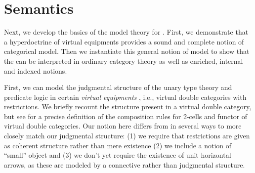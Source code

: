 \documentclass{llncs}
\begin{document}
\section{Semantics}
\label{sec:semantics}

Next, we develop the basics of the model theory for \ohol{}.
%
First, we demonstrate that a hyperdoctrine of virtual equipments
provides a sound and complete notion of categorical model.
%
Then we instantiate this general notion of model to show that the
\ohol{} can be interpreted in ordinary category theory as well as
enriched, internal and indexed notions.


First, we can model the judgmental structure of the unary type theory
and predicate logic in certain \emph{virtual equipments}
\cite{LEINSTER2002391,Cruttwell2010}, i.e., virtual double categories with
restrictions. We briefly recount the structure present in a virtual
double category, but see \citet{Cruttwell2010} for a precise
definition of the composition rules for 2-cells and functor of virtual
double categories.
%
Our notion here differs from \citet{Cruttwell2010} in several ways
to more closely match our judgmental structure: (1) we require that
restrictions are given as coherent structure rather than mere
existence (2) we include a notion of ``small'' object and (3) we don't
yet require the existence of unit horizontal arrows, as these are
modeled by a connective rather than judgmental structure.
\end{document}
